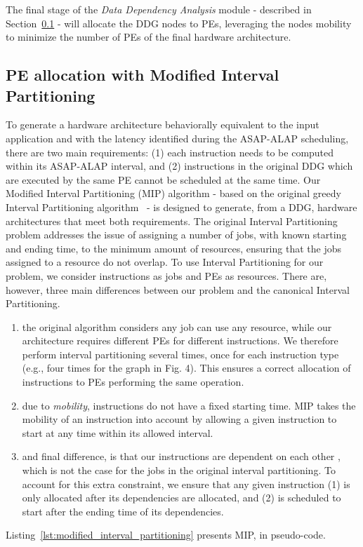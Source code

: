 The final stage of the \textit{Data Dependency Analysis} module - described in Section~\ref{ssec:modified_interval_partitioning} - will allocate the DDG nodes to PEs, leveraging the nodes mobility to minimize the number of PEs of the final hardware architecture.

\vspace{-2mm}
\subsection{PE allocation with Modified Interval Partitioning}
\label{ssec:modified_interval_partitioning}
\vspace{-1mm}
To generate a hardware architecture behaviorally equivalent to the input application and with the latency identified during the ASAP-ALAP scheduling, there are two main requirements: (1) each instruction needs to be computed within its ASAP-ALAP interval, and (2) instructions in the original DDG which are executed by the same PE cannot be scheduled at the same time.
Our Modified Interval Partitioning (MIP) algorithm - based on the original greedy Interval Partitioning algorithm~\cite{greedyIntervalPartitioning} - is designed to generate, from a DDG, hardware architectures that meet both requirements. The original Interval Partitioning problem addresses the issue of assigning a number of jobs, with known starting and ending time, to the minimum amount of resources, ensuring that the jobs assigned to a resource do not overlap. To use Interval Partitioning for our problem, we consider instructions as jobs and PEs as resources. There are, however, three main differences between our problem and the canonical Interval Partitioning.
\begin{enumerate}
\item the original algorithm considers any job can use any resource, while our architecture requires different PEs for different instructions. We therefore perform interval partitioning several times, once for each instruction type (e.g., four times for the graph in Fig. 4). This ensures a correct allocation of instructions to PEs performing the same operation.
\item due to \textit{mobility}, instructions do not have a fixed starting time. MIP takes the mobility of an instruction into account by allowing a given instruction to start at any time within its allowed interval.
\item and final difference, is that our instructions are dependent on each other , which is not the case for the jobs in the original interval partitioning. To account for this extra constraint, we ensure that any given instruction (1) is only allocated after its dependencies are allocated, and (2) is scheduled to start after the ending time of its dependencies.
\end{enumerate}
Listing~\ref{lst:modified_interval_partitioning} presents MIP, in pseudo-code. %

